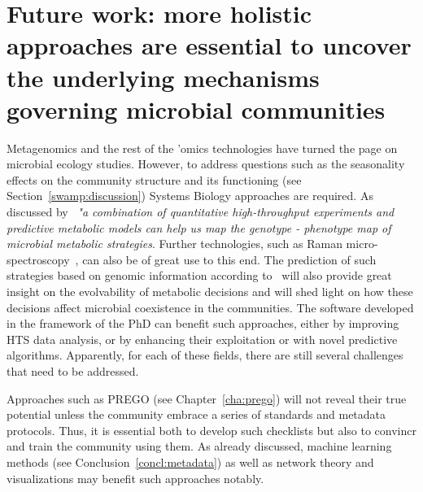 


\section{Future work: more holistic approaches are essential to uncover the underlying mechanisms governing microbial communities}
\label{chap:fut-work}


   Metagenomics and the rest of the 'omics technologies have turned the page on microbial ecology studies. 
   However, to address questions such as the seasonality effects on the community structure and its functioning 
   (see Section~\ref{swamp:discussion}) 
   Systems Biology approaches are required.
   As discussed by~\cite{bajic2020ecology} 
   \textit{"a combination of quantitative high-throughput experiments and predictive metabolic models can help us map the genotype - phenotype map of
   microbial metabolic strategies}. 
   Further technologies, such as Raman micro-spectroscopy~\citep{jing2018raman}, can also be of great use to this end. 
   The prediction of such strategies based on genomic information according to~\citeauthor{bajic2020ecology} will also provide great insight 
   on the evolvability of metabolic decisions and will
   shed light on how these decisions affect
   microbial coexistence in the communities.
   The software developed in the framework of the PhD can benefit such approaches, either by improving HTS data analysis, 
   or by enhancing their exploitation or with novel
   predictive algorithms.
   Apparently, for each of these fields, there are still several challenges that need to be addressed. 

   Approaches such as PREGO (see Chapter~\ref{cha:prego}) 
   will not reveal their true potential unless the community embrace a series of standards and 
   metadata protocols. Thus, it is essential both to develop such checklists 
   but also to convincr and train the community using them. 
   As already discussed, machine learning methods (see Conclusion~\ref{concl:metadata}) 
   as well as network theory and visualizations 
   may benefit such approaches notably. 
   
